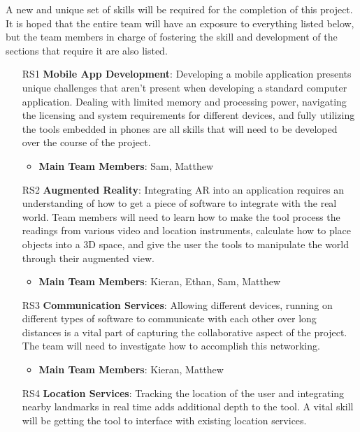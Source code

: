 \documentclass[12pt]{article}
\begin{document}

A new and unique set of skills will be required for the completion of this project. It is hoped that the entire team will have an exposure to everything listed below, but the team members in charge of fostering the skill and development of the sections that require it are also listed.

\begin{itemize}
    \item [RS1]\textbf{Mobile App Development}: Developing a mobile application presents unique challenges that aren't present when developing a standard computer application. Dealing with limited memory and processing power, navigating the licensing and system requirements for different devices, and fully utilizing the tools embedded in phones are all skills that will need to be developed over the course of the project. 
    \begin{itemize}
        \item \textbf{Main Team Members}: Sam, Matthew
    \end{itemize}
    \item [RS2]\textbf{Augmented Reality}: Integrating AR into an application requires an understanding of how to get a piece of software to integrate with the real world. Team members will need to learn how to make the tool process the readings from various video and location instruments, calculate how to place objects into a 3D space, and give the user the tools to manipulate the world through their augmented view. 
    \begin{itemize}
        \item \textbf{Main Team Members}: Kieran, Ethan, Sam, Matthew
    \end{itemize}
    \item [RS3]\textbf{Communication Services}: Allowing different devices, running on different types of software to communicate with each other over long distances is a vital part of capturing the collaborative aspect of the project. The team will need to investigate how to accomplish this networking. 
    \begin{itemize}
        \item \textbf{Main Team Members}: Kieran, Matthew
    \end{itemize}
    \item [RS4]\textbf{Location Services}: Tracking the location of the user and integrating nearby landmarks in real time adds additional depth to the tool. A vital skill will be getting the tool to interface with existing location services. 

\end{itemize}
\end{document}
